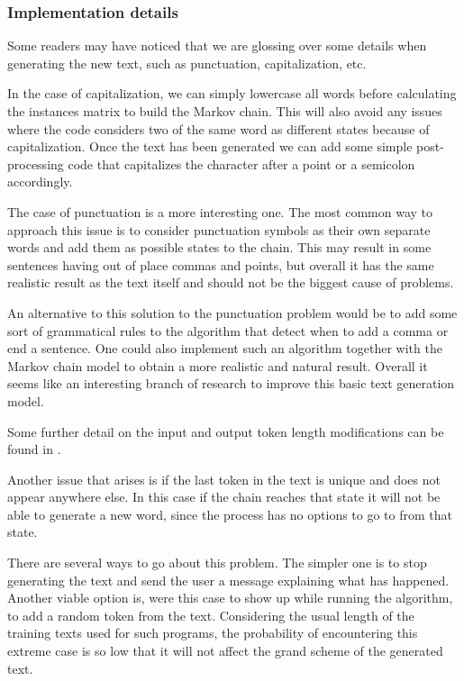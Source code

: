 \documentclass[12pt]{article}
\numberwithin{equation}{section}
\begin{document}
\subsubsection{Implementation details}

Some readers may have noticed that we are glossing over some details when generating the new text, such as punctuation, capitalization, etc.

\bigskip

In the case of capitalization, we can simply lowercase all words before calculating the instances matrix to build the Markov chain. This will also avoid any issues where the code considers two of the same word as different states because of capitalization. Once the text has been generated we can add some simple post-processing code that capitalizes the character after a point or a semicolon accordingly.

\bigskip

The case of punctuation is a more interesting one. The most common way to approach this issue is to consider punctuation symbols as their own separate words and add them as possible states to the chain. This may result in some sentences having out of place commas and points, but overall it has the same realistic result as the text itself and should not be the biggest cause of problems.

An alternative to this solution to the punctuation problem would be to add some sort of grammatical rules to the algorithm that detect when to add a comma or end a sentence. One could also implement such an algorithm together with the Markov chain model to obtain a more realistic and natural result. Overall it seems like an interesting branch of research to improve this basic text generation model.

Some further detail on the input and output token length modifications can be found in \cite{szymanski2004line}.

\bigskip

Another issue that arises is if the last token in the text is unique and does not appear anywhere else. In this case if the chain reaches that state it will not be able to generate a new word, since the process has no options to go to from that state.

There are several ways to go about this problem. The simpler one is to stop generating the text and send the user a message explaining what has happened. Another viable option is, were this case to show up while running the algorithm, to add a random token from the text. Considering the usual length of the training texts used for such programs, the probability of encountering this extreme case is so low that it will not affect the grand scheme of the generated text.
\end{document}
